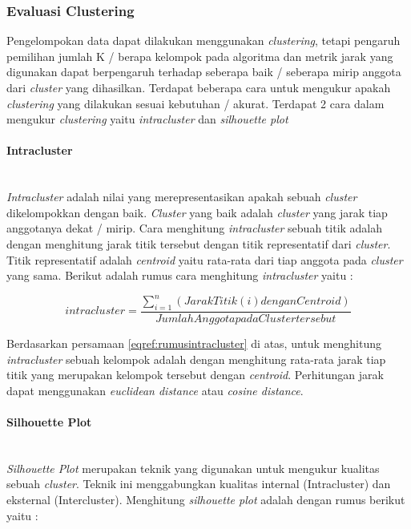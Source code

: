 \pagebreak

\subsubsection{Evaluasi Clustering}
Pengelompokan data dapat dilakukan menggunakan \textit{clustering}, tetapi pengaruh pemilihan jumlah K / berapa kelompok pada algoritma dan metrik jarak yang digunakan dapat berpengaruh terhadap seberapa baik / seberapa mirip anggota dari \textit{cluster} yang dihasilkan. Terdapat beberapa cara untuk mengukur apakah \textit{clustering} yang dilakukan sesuai kebutuhan / akurat. Terdapat 2 cara dalam mengukur \textit{clustering} yaitu \textit{intracluster} dan \textit{silhouette plot}

\paragraph{Intracluster} \mbox{}\\
\textit{Intracluster} adalah nilai yang merepresentasikan apakah sebuah \textit{cluster} dikelompokkan dengan baik. \textit{Cluster} yang baik adalah \textit{cluster} yang jarak tiap anggotanya dekat / mirip. Cara menghitung \textit{intracluster} sebuah titik adalah dengan menghitung jarak titik tersebut dengan titik representatif dari \textit{cluster}. Titik representatif adalah \textit{centroid} yaitu rata-rata dari tiap anggota pada \textit{cluster} yang sama. Berikut adalah rumus cara menghitung \textit{intracluster} yaitu :

\begin{equation}
intracluster  = \frac{\sum_{i=1}^{n}(Jarak Titik (i) dengan Centroid)}{Jumlah Anggota pada Cluster tersebut}
\label{eqref:rumusintracluster}
\end{equation}

Berdasarkan persamaan \eqref{eqref:rumusintracluster} di atas, untuk menghitung \textit{intracluster} sebuah kelompok adalah dengan menghitung rata-rata jarak tiap titik yang merupakan kelompok tersebut dengan \textit{centroid}. Perhitungan jarak dapat menggunakan \textit{euclidean distance} atau \textit{cosine distance}.

\paragraph{Silhouette Plot} \mbox{}\\
\textit{Silhouette Plot} merupakan teknik yang digunakan untuk mengukur kualitas sebuah \textit{cluster}. Teknik ini menggabungkan kualitas internal (Intracluster) dan eksternal (Intercluster). Menghitung \textit{silhouette plot} adalah dengan rumus berikut yaitu : 

